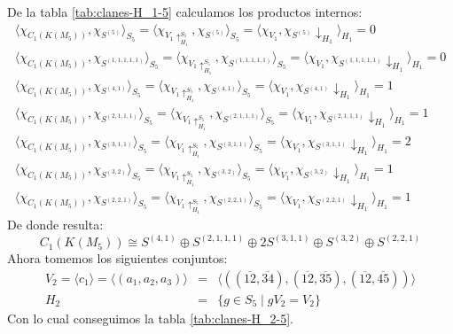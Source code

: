 \documentclass[12pt]{book}
\theoremstyle{definition}
\newcounter{in}
\begin{document}
De la tabla \ref{tab:clanes-H_1-5} calculamos los productos internos:
\begin{eqnarray*}
  \langle\chi_{C_{1}(K(M_{5}))},\chi_{S^{(5)}}\rangle_{S_{5}}=\langle\chi_{V_{1}\uparrow^{S_{5}}_{H_1}},\chi_{S^{(5)}}\rangle_{S_{5}}=\langle\chi_{V_{1}},\chi_{S^{(5)}}\downarrow_{H_{1}}\rangle_{H_{1}}=0\\
  \langle\chi_{C_{1}(K(M_{5}))},\chi_{S^{(1,1,1,1,1)}}\rangle_{S_{5}}=\langle\chi_{V_{1}\uparrow^{S_{5}}_{H_1}},\chi_{S^{(1,1,1,1,1)}}\rangle_{S_{5}}=\langle\chi_{V_{1}},\chi_{S^{(1,1,1,1,1)}}\downarrow_{H_{1}}\rangle_{H_{1}}=0\\
  \langle\chi_{C_{1}(K(M_{5}))},\chi_{S^{(4,1)}}\rangle_{S_{5}}=\langle\chi_{V_{1}\uparrow^{S_{5}}_{H_1}},\chi_{S^{(4,1)}}\rangle_{S_{5}}=\langle\chi_{V_{1}},\chi_{S^{(4,1)}}\downarrow_{H_{1}}\rangle_{H_{1}}=1\\
  \langle\chi_{C_{1}(K(M_{5}))},\chi_{S^{(2,1,1,1)}}\rangle_{S_{5}}=\langle\chi_{V_{1}\uparrow^{S_{5}}_{H_1}},\chi_{S^{(2,1,1,1)}}\rangle_{S_{5}}=\langle\chi_{V_{1}},\chi_{S^{(2,1,1,1)}}\downarrow_{H_{1}}\rangle_{H_{1}}=1\\
  \langle\chi_{C_{1}(K(M_{5}))},\chi_{S^{(3,1,1)}}\rangle_{S_{5}}=\langle\chi_{V_{1}\uparrow^{S_{5}}_{H_1}},\chi_{S^{(3,1,1)}}\rangle_{S_{5}}=\langle\chi_{V_{1}},\chi_{S^{(3,1,1)}}\downarrow_{H_{1}}\rangle_{H_{1}}=2\\
  \langle\chi_{C_{1}(K(M_{5}))},\chi_{S^{(3,2)}}\rangle_{S_{5}}=\langle\chi_{V_{1}\uparrow^{S_{5}}_{H_1}},\chi_{S^{(3,2)}}\rangle_{S_{5}}=\langle\chi_{V_{1}},\chi_{S^{(3,2)}}\downarrow_{H_{1}}\rangle_{H_{1}}=1\\
  \langle\chi_{C_{1}(K(M_{5}))},\chi_{S^{(2,2,1)}}\rangle_{S_{5}}=\langle\chi_{V_{1}\uparrow^{S_{5}}_{H_1}},\chi_{S^{(2,2,1)}}\rangle_{S_{5}}=\langle\chi_{V_{1}},\chi_{S^{(2,2,1)}}\downarrow_{H_{1}}\rangle_{H_{1}}=1
\end{eqnarray*}
De donde resulta:
\begin{equation}
C_{1}(K(M_{5}))\cong S^{(4,1)}\oplus S^{(2,1,1,1)}\oplus
2S^{(3,1,1)}\oplus S^{(3,2)} \oplus S^{(2,2,1)}
\label{C1-KM5}
\end{equation}
Ahora tomemos los siguientes conjuntos:
\begin{eqnarray*}
V_{2}=\langle c_{1}\rangle=\langle
(a_{1},a_{2},a_{3})\rangle&=&\langle((\overline{12},\overline{34}),(\overline{12},\overline{35}),(\overline{12},\overline{45}))\rangle\\
H_{2}&=&\{g\in S_{5}\mid gV_{2}=V_{2}\}
\end{eqnarray*}
Con lo cual conseguimos la tabla \ref{tab:clanes-H_2-5}.
\end{document}
